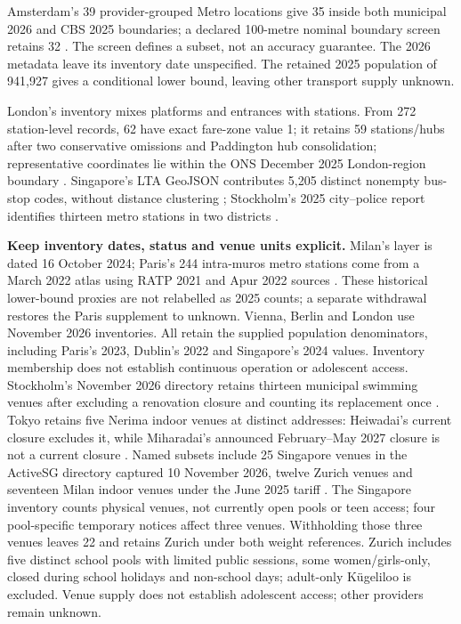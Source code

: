 Amsterdam's 39 provider-grouped Metro locations give 35 inside both municipal
2026 and CBS 2025 boundaries; a declared 100-metre nominal boundary screen
retains 32 \cite{amsterdammetro2026,cbsboundary2025}. The screen defines a subset,
not an accuracy guarantee. The 2026 metadata leave its inventory date unspecified.
The retained 2025 population of 941,927 gives a conditional lower bound,
leaving other transport supply unknown.

London's inventory mixes platforms and entrances with stations. From 272
station-level records, 62 have exact fare-zone value 1; it retains 59
stations/hubs after two conservative omissions and
Paddington hub consolidation; representative coordinates lie within the ONS
December 2025 London-region boundary \cite{tflinventory,onslondon}.
Singapore's LTA GeoJSON contributes 5,205 distinct nonempty bus-stop codes,
without distance clustering \cite{sgbus_lta}; Stockholm's 2025 city--police
report identifies thirteen metro stations in two districts \cite{stockholmmetro2025}.

\textbf{Keep inventory dates, status and venue units explicit.}
Milan's layer is dated 16 October 2024; Paris's 244 intra-muros metro stations
come from a March 2022 atlas using RATP 2021 and Apur 2022 sources
\cite{milanmetro,apur}. These historical lower-bound proxies are not relabelled
as 2025 counts; a separate withdrawal restores the Paris supplement to unknown.
Vienna, Berlin and London use November 2026 inventories. All retain the supplied
population denominators, including Paris's 2023, Dublin's 2022 and
Singapore's 2024 values. Inventory membership
does not establish continuous operation or adolescent access.
Stockholm's November 2026 directory retains thirteen municipal swimming venues after excluding a
renovation closure and counting its replacement once \cite{stockpool}.
Tokyo retains five Nerima indoor venues at distinct addresses: Heiwadai's
current closure excludes it, while Miharadai's announced February--May 2027
closure is not a current closure \cite{nerimapool,nerimaclose}.
Named subsets include 25 Singapore venues in the ActiveSG directory captured
10 November 2026, twelve Zurich venues and seventeen Milan indoor venues under
the June 2025 tariff \cite{sgpool_directory,sgpool_2025,zurichpool,milanpool2025}.
The Singapore inventory counts physical venues, not currently open pools or
teen access; four pool-specific temporary notices affect three venues. Withholding
those three venues leaves 22 and retains Zurich under both weight references.
Zurich includes five distinct school pools with limited public sessions, some
women/girls-only, closed during school holidays and non-school days; adult-only
K\"ugeliloo is excluded. Venue supply does not establish adolescent access;
other providers remain unknown.

